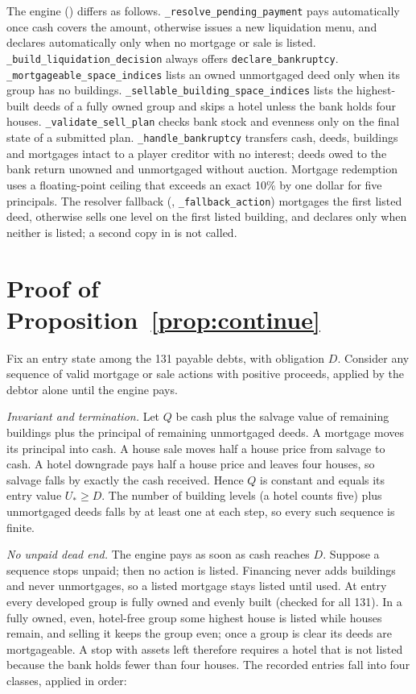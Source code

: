 The engine () differs as follows. \texttt{\_resolve\_pending\_payment} pays automatically once cash covers the amount, otherwise issues a new liquidation menu, and declares automatically only when no mortgage or sale is listed. \texttt{\_build\_liquidation\_decision} always offers \texttt{declare\_bankruptcy}. \texttt{\_mortgageable\_space\_indices} lists an owned unmortgaged deed only when its group has no buildings. \texttt{\_sellable\_building\_space\_indices} lists the highest-built deeds of a fully owned group and skips a hotel unless the bank holds four houses. \texttt{\_validate\_sell\_plan} checks bank stock and evenness only on the final state of a submitted plan. \texttt{\_handle\_bankruptcy} transfers cash, deeds, buildings and mortgages intact to a player creditor with no interest; deeds owed to the bank return unowned and unmortgaged without auction. Mortgage redemption uses a floating-point ceiling that exceeds an exact 10\% by one dollar for five principals. The resolver fallback (, \texttt{\_fallback\_action}) mortgages the first listed deed, otherwise sells one level on the first listed building, and declares only when neither is listed; a second copy in  is not called.

\section{Proof of Proposition~\ref{prop:continue}}
\label{app:proof}
Fix an entry state among the 131 payable debts, with obligation $D$. Consider any sequence of valid mortgage or sale actions with positive proceeds, applied by the debtor alone until the engine pays.

\emph{Invariant and termination.} Let $Q$ be cash plus the salvage value of remaining buildings plus the principal of remaining unmortgaged deeds. A mortgage moves its principal into cash. A house sale moves half a house price from salvage to cash. A hotel downgrade pays half a house price and leaves four houses, so salvage falls by exactly the cash received. Hence $Q$ is constant and equals its entry value $U_*\ge D$. The number of building levels (a hotel counts five) plus unmortgaged deeds falls by at least one at each step, so every such sequence is finite.

\emph{No unpaid dead end.} The engine pays as soon as cash reaches $D$. Suppose a sequence stops unpaid; then no action is listed. Financing never adds buildings and never unmortgages, so a listed mortgage stays listed until used. At entry every developed group is fully owned and evenly built (checked for all 131). In a fully owned, even, hotel-free group some highest house is listed while houses remain, and selling it keeps the group even; once a group is clear its deeds are mortgageable. A stop with assets left therefore requires a hotel that is not listed because the bank holds fewer than four houses. The recorded entries fall into four classes, applied in order:

